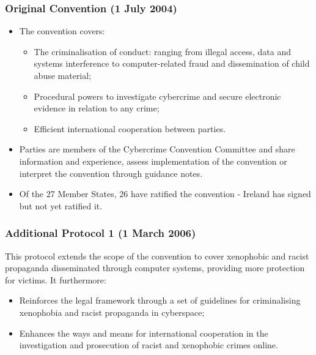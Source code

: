 \subsubsection{Original Convention (1 July 2004)}
\begin{itemize}[itemsep=0pt]
  \item The convention covers:
    \begin{itemize}[itemsep=0pt]
      \item The criminalisation of conduct: ranging from illegal access, data and systems interference to computer-related fraud and dissemination of child abuse material;
      \item Procedural powers to investigate cybercrime and secure electronic evidence in relation to any crime;
      \item Efficient international cooperation between parties.
    \end{itemize}
  \item Parties are members of the Cybercrime Convention Committee and share information and experience, assess implementation of the convention or interpret the convention through guidance notes.
  \item Of the 27 Member States, 26 have ratified the convention - Ireland has signed but not yet ratified it.
\end{itemize}

\subsubsection{Additional Protocol 1 (1 March 2006)}

This protocol extends the scope of the convention to cover xenophobic and racist propaganda disseminated through computer systems, providing more protection for victims. It furthermore:

\begin{itemize}[itemsep=0pt]
  \item  Reinforces the legal framework through a set of guidelines for criminalising xenophobia and racist propaganda in cyberspace;
  \item Enhances the ways and means for international cooperation in the investigation and prosecution of racist and xenophobic crimes online.
\end{itemize}

